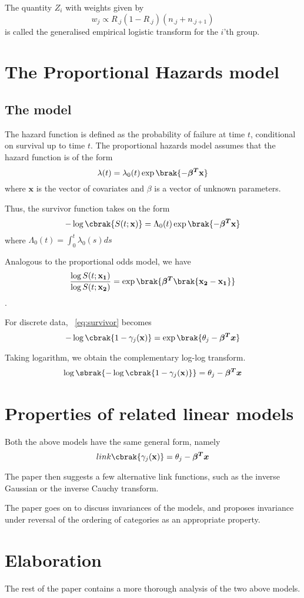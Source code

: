 \documentclass{amsart}
\begin{document}
        The quantity \(Z_i\) with weights given by \[w_j \propto R_{.j}(1 - R_{.j})(n_{.j} + n_{.j + 1})\] is called the generalised empirical logistic transform for the \(i\)'th group.

    \section{The Proportional Hazards model}

    \subsection{The model}

        The hazard function is defined as the probability of failure at time \(t\), conditional on survival up to time \(t\). The proportional hazards model assumes that the hazard function is of the form 
        \[\lambda(t) = \lambda_0(t) \exp \brak{- \boldsymbol{\beta^T} \mathbf{x}}\] 
        where \(\mathbf{x}\) is the vector of covariates and \(\beta\) is a vector of unknown parameters. 
        
        Thus, the survivor function takes on the form 
        \[-\log \cbrak{S(t; \mathbf{x})} = \Lambda_0(t) \exp \brak{-\boldsymbol{\beta^T} \mathbf{x}} \label{eq:survivor}\] 
        where \(\Lambda_0(t) = \int_{0}^{t} \lambda_0(s) ds \)

        Analogous to the proportional odds model, we have 
        \[ \frac{\log S(t; \mathbf{x_1})}{\log S(t; \mathbf{x_2})} = \exp \brak{\boldsymbol{\beta^T} \brak{\mathbf{x_2 - x_1}}}\].


        For discrete data, ~\ref{eq:survivor} becomes 
        \[-\log \cbrak{1 - \gamma_j (\mathbf{x})} = \exp \brak{\theta_j - \boldsymbol{\beta^T x}}\]

        Taking logarithm, we obtain the complementary log-log transform.
        \[\log \sbrak{ - \log \cbrak{1 - \gamma_j (\mathbf{x})}} = \theta_j - \boldsymbol{\beta^T x} \]

        \section{Properties of related linear models}

        Both the above models have the same general form, namely \[link\cbrak{\gamma_j(\mathbf{x})} = \theta_j - \boldsymbol{\beta^T x} \]

        The paper then suggests a few alternative link functions, such as the inverse Gaussian or the inverse Cauchy transform.

        The paper goes on to discuss invariances of the models, and proposes invariance under reversal of the ordering of categories as an appropriate property. 

    \section{Elaboration}

    The rest of the paper contains a more thorough analysis of the two above models.

    
\end{document}
